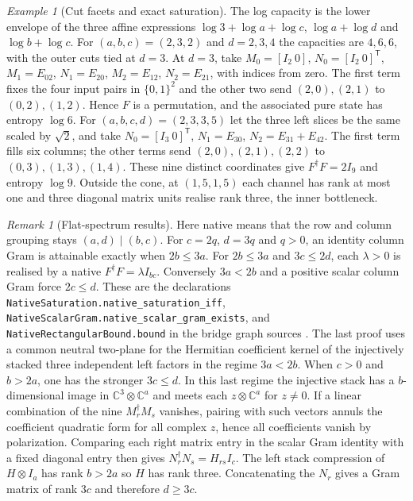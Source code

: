 \documentclass[aps,pra,onecolumn,superscriptaddress,nofootinbib,10pt]{revtex4-2}
\theoremstyle{definition}
\theoremstyle{remark}
\newtheorem{remark}[theorem]{Remark}
\newtheorem{example}[theorem]{Example}
\begin{document}
\begin{example}[Cut facets and exact saturation]\label{ub:bridgeexamples}
The log capacity is the lower envelope of the three affine expressions
$\log3+\log a+\log c$, $\log a+\log d$ and $\log b+\log c$.
For $(a,b,c)=(2,3,2)$ and $d=2,3,4$ the capacities are $4,6,6$,
with the outer cuts tied at $d=3$. At $d=3$, take
$M_0=[I_2\ 0]$, $N_0=[I_2\ 0]^{\mathsf T}$,
$M_1=E_{02}$, $N_1=E_{20}$, $M_2=E_{12}$, $N_2=E_{21}$,
with indices from zero. The first term fixes the four input
pairs in $\{0,1\}^2$ and the other two send $(2,0),(2,1)$ to
$(0,2),(1,2)$. Hence $F$ is a permutation, and the associated
pure state has entropy $\log6$.
For $(a,b,c,d)=(2,3,3,5)$ let the three left slices be the same
scaled by $\sqrt2$, and take $N_0=[I_3\ 0]^{\mathsf T}$,
$N_1=E_{30}$, $N_2=E_{31}+E_{42}$. The first term fills six
columns; the other terms send $(2,0),(2,1),(2,2)$ to
$(0,3),(1,3),(1,4)$. These nine distinct coordinates give
$F^\dagger F=2I_9$ and entropy $\log9$. Outside the cone, at
$(1,5,1,5)$ each channel has rank at most one and three diagonal
matrix units realise rank three, the inner bottleneck.
\end{example}

\begin{remark}[Flat-spectrum results]\label{ub:flat}
Here native means that the row and column grouping stays
$(a,d)\mid(b,c)$. For $c=2q$, $d=3q$ and $q>0$, an identity column Gram is
attainable exactly when $2b\le3a$.
For $2b\le3a$ and $3c\le2d$, each $\lambda>0$ is realised by a
native $F^\dagger F=\lambda I_{bc}$.
Conversely $3a<2b$ and a positive scalar column Gram force
$2c\le d$. These are the declarations
\texttt{NativeSaturation.native\_saturation\_iff},
\texttt{NativeScalarGram.native\_scalar\_gram\_exists}, and
\texttt{NativeRectangularBound.bound} in the bridge graph sources
\cite{ub:lean}. The last proof uses a common neutral two-plane for
the Hermitian coefficient kernel of the injectively stacked
three independent left factors in the regime $3a<2b$. When
$c>0$ and $b>2a$, one has the stronger $3c\le d$. In this last
regime the injective stack has a $b$-dimensional image in
$\mathbb C^3\otimes\mathbb C^a$ and meets each
$z\otimes\mathbb C^a$ for $z\ne0$. If a linear combination of the
nine $M_r^\dagger M_s$ vanishes, pairing with such vectors
annuls the coefficient quadratic form for all complex $z$, hence
all coefficients vanish by polarization. Comparing each right
matrix entry in the scalar Gram identity with a fixed diagonal
entry then gives $N_r^\dagger N_s=H_{rs}I_c$. The left stack
compression of $H\otimes I_a$ has rank $b>2a$ so $H$ has rank
three. Concatenating the $N_r$ gives a Gram matrix of rank $3c$
and therefore $d\ge3c$.
\end{remark}
\end{document}
